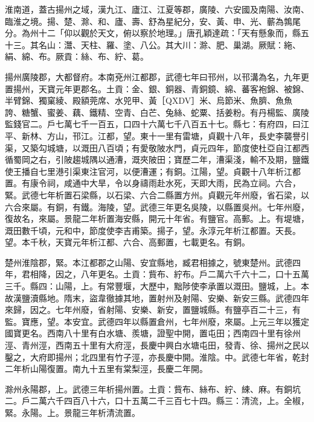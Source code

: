 
\begin{pinyinscope}

 淮南道，蓋古揚州之域，漢九江、廬江、江夏等郡，廣陵、六安國及南陽、汝南、臨淮之境。揚、楚、滁、和、廬、壽、舒為星紀分，安、黃、申、光、蘄為鶉尾分。為州十二「仰以觀於天文，俯以察於地理。」唐孔穎達疏：「天有懸象而，縣五十三。其名山：灊、天柱、羅、塗、八公。其大川：滁、肥、巢湖。厥賦：絁、絹、綿、布。厥貢：絲、布、紵、葛。



 揚州廣陵郡，大都督府。本南兗州江都郡，武德七年曰邗州，以邗溝為名，九年更置揚州，天寶元年更郡名。土貢：金、銀、銅器、青銅鏡、綿、蕃客袍錦、被錦、半臂錦、獨窠綾、殿額莞席、水兕甲、黃［QXDV］米、烏節米、魚臍、魚魚誇、糖蟹、蜜姜、藕、鐵精、空青、白芒、兔絲、蛇粟、括姜粉。有丹楊監、廣陵監錢官二。戶七萬七千一百五，口四十六萬七千八百五十七。縣七：有府四，曰江平、新林、方山，邗江。江都，望。東十一里有雷塘，貞觀十八年，長史李襲譽引渠，又築勾城塘，以溉田八百頃；有愛敬陂水門，貞元四年，節度使杜亞自江都西循蜀岡之右，引陂趨城隅以通漕，溉夾陂田；寶歷二年，漕渠淺，輸不及期，鹽鐵使王播自七里港引渠東注官河，以便漕運；有銅。江陽，望。貞觀十八年析江都置。有康令祠，咸通中大旱，令以身禱雨赴水死，天即大雨，民為立祠。六合，緊。武德七年析置石梁縣，以石梁、六合二縣置方州。貞觀元年州廢，省石梁，以六合來屬。有銅，有鐵。海陵，望。武德三年更名吳陵，以縣置吳州。七年州廢，復故名，來屬。景龍二年析置海安縣，開元十年省。有鹽官。高郵。上。有堤塘，溉田數千頃，元和中，節度使李吉甫築。揚子，望。永淳元年析江都置。天長。望。本千秋，天寶元年析江都、六合、高郵置，七載更名。有銅。



 楚州淮陰郡，緊。本江都郡之山陽、安宜縣地，臧君相據之，號東楚州。武德四年，君相降，因之，八年更名。土貢：貲布、紵布。戶二萬六千六十二，口十五萬三千。縣四：山陽，上。有常豐堰，大歷中，黜陟使李承置以溉田。鹽城，上。本故漢鹽瀆縣地。隋末，盜韋徹據其地，置射州及射陽、安樂、新安三縣。武德四年來歸，因之。七年州廢，省射陽、安樂、新安，置鹽城縣。有鹽亭百二十三，有監。寶應，望。本安宜。武德四年以縣置倉州，七年州廢，來屬。上元三年以獲定國寶更名。西南八十里有白水塘、羨塘，證聖中開，置屯田；西南四十里有徐州涇、青州涇，西南五十里有大府涇，長慶中興白水塘屯田，發青、徐、揚州之民以鑿之，大府即揚州；北四里有竹子涇，亦長慶中開。淮陰。中。武德七年省，乾封二年析山陽復置。南九十五里有棠梨涇，長慶二年開。



 滁州永陽郡，上。武德三年析揚州置。土貢：貲布、絲布、紵、綀、麻。有銅坑二。戶二萬六千四百八十六，口十五萬二千三百七十四。縣三：清流，上。全椒，緊。永陽。上。景龍三年析清流置。




\end{pinyinscope}
